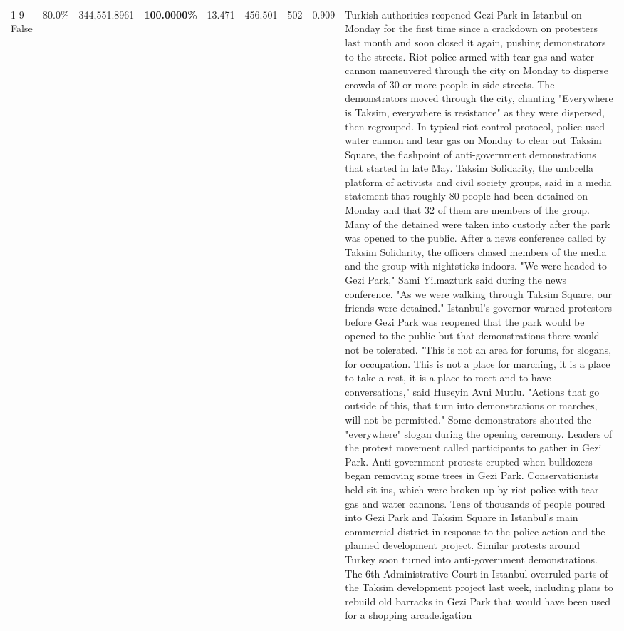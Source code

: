 \begin{table}[H]
\begin{tabular}{lllrlllll}
\cline{1-9}
False & 80.0\% & 344,551.8961 & \bfseries \color{red} 100.0000\% & 13.471 & 456.501 & 502 & 0.909 & Turkish authorities reopened Gezi Park in Istanbul on Monday for the first time since a crackdown on protesters last month and soon closed it again, pushing demonstrators to the streets. Riot police armed with tear gas and water cannon maneuvered through the city on Monday to disperse crowds of 30 or more people in side streets. The demonstrators moved through the city, chanting "Everywhere is Taksim, everywhere is resistance" as they were dispersed, then regrouped. In typical riot control protocol, police used water cannon and tear gas on Monday to clear out Taksim Square, the flashpoint of anti-government demonstrations that started in late May. Taksim Solidarity, the umbrella platform of activists and civil society groups, said in a media statement that roughly 80 people had been detained on Monday and that 32 of them are members of the group. Many of the detained were taken into custody after the park was opened to the public. After a news conference called by Taksim Solidarity, the officers chased members of the media and the group with nightsticks indoors. "We were headed to Gezi Park," Sami Yilmazturk said during the news conference. "As we were walking through Taksim Square, our friends were detained." Istanbul's governor warned protestors before Gezi Park was reopened that the park would be opened to the public but that demonstrations there would not be tolerated. "This is not an area for forums, for slogans, for occupation. This is not a place for marching, it is a place to take a rest, it is a place to meet and to have conversations," said Huseyin Avni Mutlu. "Actions that go outside of this, that turn into demonstrations or marches, will not be permitted." Some demonstrators shouted the "everywhere" slogan during the opening ceremony. Leaders of the protest movement called participants to gather in Gezi Park. Anti-government protests erupted when bulldozers began removing some trees in Gezi Park. Conservationists held sit-ins, which were broken up by riot police with tear gas and water cannons. Tens of thousands of people poured into Gezi Park and Taksim Square in Istanbul's main commercial district in response to the police action and the planned development project. Similar protests around Turkey soon turned into anti-government demonstrations. The 6th Administrative Court in Istanbul overruled parts of the Taksim development project last week, including plans to rebuild old barracks in Gezi Park that would have been used for a shopping arcade.igation \\

\end{tabular}
\end{table}
